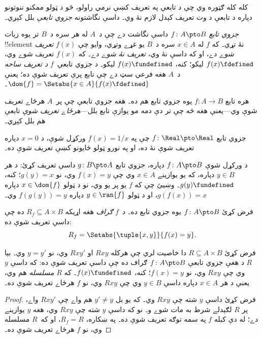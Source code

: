 \documentclass[../../../include/open-logic-section]{subfiles}
\begin{document}


\begin{explain}
کله کله ګټوره وي چې د تابعې په تعريف کښې نرمي راولو، څو د ټولو
ممکنو ننوتونو دپاره د تابعې د وت تعريف کېدل لازم نۀ وي۔ داسې
نگاشتونه \emph{جزوي تابعې} بلل کېږي۔
\end{explain}

\begin{defn}
\emph{جزوي تابع} $f \colon A \pto B$ داسې نگاشت دے چې د~$A$ له
هر  سره د~$B$ تر يوه زيات !!{element} نۀ
تړي۔ که $f$ له $x \in A$ سره د~$B$ يو غړے وتړي، وايو چې $f(x)$
\emph{تعريف شوے} دے، او که داسې نۀ وي، \emph{تعريف نۀ شوے} دے۔
که $f(x)$ تعريف شوے وي، $f(x) \fdefined$ ليکو؛ کنه،
$f(x) \fundefined$ ليکو۔ د جزوي تابعې~$f$ \emph{د تعريف ساحه}
د~$A$ هغه فرعي سټ دے چې تابع پرې تعريف شوې ده؛ يعنې
$\dom{f} = \Setabs{x \in A}{f(x) \fdefined}$۔
\end{defn}

\begin{ex}
هره تابع $f\colon A \to B$ يوه جزوي تابع هم ده۔ هغه جزوي تابعې
چې پر~$A$ هرځاے تعريف شوې وي---يعنې هغه څه چې تر دې دمه مو
يوازې تابع بلل---\emph{هرځاے تعريف شوې} تابعې هم بلل کېږي۔
\end{ex}

\begin{ex}
جزوي تابع $f \colon \Real \pto \Real$ چې په $f(x) = 1/x$ ورکړل
شوې، د $x = 0$ دپاره تعريف شوې نۀ ده، او په نورو ټولو ځايونو
کښې تعريف شوې ده۔
\end{ex}

\begin{prob}
د ورکړل شوې $f\colon A \pto B$ دپاره، جزوي تابع $g\colon B \pto
A$ داسې تعريف کړئ: د هر $y \in B$ دپاره، که يو يوازينے
$x \in A$ وي چې $f(x) = y$ وي، نو $g(y) = x$؛ کنه،
$g(y) \fundefined$۔ وښيئ چې که $f$ يو پر يو وي، نو د ټولو
$x \in \dom{f}$ دپاره $g(f(x)) = x$، او د ټولو $y \in \ran{f}$
دپاره $f(g(y)) = y$ وي۔
\end{prob}

\begin{defn}
فرض کړئ $f\colon A \pto B$ يوه جزوي تابع ده۔ د~$f$ \emph{ګراف}
هغه اړيکه $R_f \subseteq A \times B$ ده چې داسې تعريف شوې ده:
\[
R_f = \Setabs{\tuple{x,y}}{f(x) = y}.
\]
\end{defn}

\begin{prop}
فرض کړئ $R \subseteq A \times B$ دا خاصيت لري چې هرکله $Rxy$
او $Rxy'$ وي، نو $y = y'$ وي۔ بيا $R$ د هغې جزوي تابعې
$f\colon A \pto B$ ګراف ده چې داسې تعريف شوې ده: که داسې $y$
وي چې $Rxy$ وي، نو $f(x) = y$؛ کنه، $f(x) \fundefined$۔ که $R$
\emph{مسلسله} هم وي، يعنې د هر $x \in A$ دپاره داسې $y \in B$
وي چې $Rxy$ وي، نو $f$ هرځاے تعريف شوې ده۔
\end{prop}

\begin{proof}
فرض کړئ داسې $y$ شته چې $Rxy$ وي۔ که يو بل $y' \neq y$ هم واے
چې $Rxy'$ واے، پر $R$ لګېدلے شرط به مات شوے و۔ نو که داسې $y$
شته چې $Rxy$ وي، هغه $y$ يوازينے دے؛ له دې کبله $f$ په سمه
توګه تعريف شوې ده۔ په ښکاره، $R_f = R$، او که~$R$ مسلسله وي،
نو $f$ هرځاے تعريف شوې ده۔
\end{proof}
\end{document}
